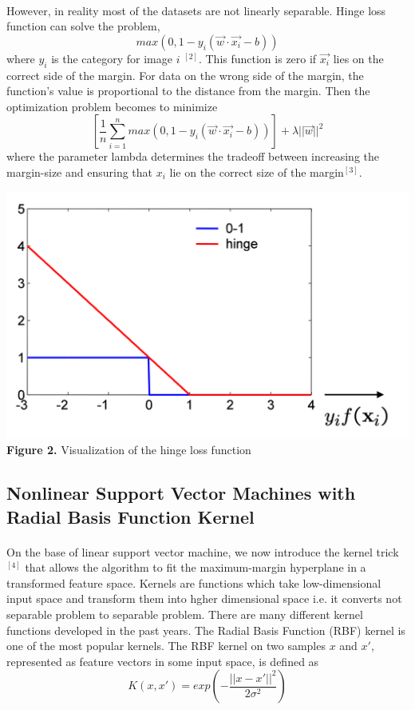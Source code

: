 \documentclass{article}
\begin{document}
\paragraph{}
However, in reality most of the datasets are not linearly separable. Hinge loss function can solve the problem,
\[ max(0, 1-y_i(\vec{w} \cdot \vec{x_i}-b))\]
where $y_i$ is the category for image $i$ $^{[2]}$. This function is zero if $\vec{x_i}$ lies on the correct side of the margin. For data on the wrong side of the margin, the function's value is proportional to the distance from the margin. Then the optimization problem becomes to minimize\[
[\frac{1}{n}\sum_{i=1}^n max(0,1-y_i(\vec{w} \cdot \vec{x_i}-b))]+\lambda ||\vec{w} ||^2 \]
where the parameter lambda determines the tradeoff between increasing the margin-size and ensuring that $x_i$ lie on the correct size of the margin$^{[3]}$. 
\begin{center}
\includegraphics[scale=0.3]{7.png}\\
\textbf{ Figure 2.} Visualization of the hinge loss function 
\end{center}

\subsection{Nonlinear Support Vector Machines with Radial Basis Function Kernel}
\paragraph{}
On the base of linear support vector machine, we now introduce the kernel trick$^{[4]}$ that allows the algorithm to fit the maximum-margin hyperplane in a transformed feature space. Kernels are functions which take low-dimensional input space and transform them into hgher dimensional space i.e. it converts not separable problem to separable problem. There are many different kernel functions developed in the past years. The Radial Basis Function (RBF) kernel is one of the most popular kernels. The RBF kernel on two samples $x$ and $x'$, represented as feature vectors in some input space, is defined as
\[K(x,x') = exp(-\frac{||x-x'||^2}{2\sigma^2}) \]
\end{document}
